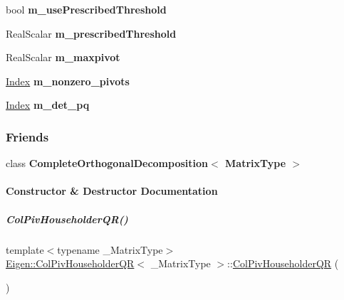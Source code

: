 \begin{DoxyCompactItemize}
\mbox{\label{group___q_r___module_ad155de2c03a65d9be81a9174efe6e43a}} 
bool {\bfseries m\+\_\+use\+Prescribed\+Threshold}
\item 
\mbox{\label{group___q_r___module_a9a4f85e7fb5dbb8d46781550f567e1fc}} 
Real\+Scalar {\bfseries m\+\_\+prescribed\+Threshold}
\item 
\mbox{\label{group___q_r___module_a65f1f2cae0c047868da485c8db81f1a3}} 
Real\+Scalar {\bfseries m\+\_\+maxpivot}
\item 
\mbox{\label{group___q_r___module_ab99a6c9cc74ca1441d955605cccad919}} 
\hyperlink{namespace_eigen_a62e77e0933482dafde8fe197d9a2cfde}{Index} {\bfseries m\+\_\+nonzero\+\_\+pivots}
\item 
\mbox{\label{group___q_r___module_a43597f3b3ae67cc05edac305ef24dad7}} 
\hyperlink{namespace_eigen_a62e77e0933482dafde8fe197d9a2cfde}{Index} {\bfseries m\+\_\+det\+\_\+pq}
\end{DoxyCompactItemize}
\subsubsection*{Friends}
\begin{DoxyCompactItemize}
\item 
\mbox{\label{group___q_r___module_a6c741054e65697365ce75f1bbec5802b}} 
class {\bfseries Complete\+Orthogonal\+Decomposition$<$ Matrix\+Type $>$}
\end{DoxyCompactItemize}


\paragraph{Constructor \& Destructor Documentation}
\mbox{\label{group___q_r___module_a9d8a92c2a2f0debe5454812372237ed4}} 
\subparagraph{\texorpdfstring{Col\+Piv\+Householder\+Q\+R()}{ColPivHouseholderQR()}\hspace{0.1cm}{\footnotesize\ttfamily [1/8]}}
{\footnotesize\ttfamily template$<$typename \+\_\+\+Matrix\+Type$>$ \\
\hyperlink{group___q_r___module_class_eigen_1_1_col_piv_householder_q_r}{Eigen\+::\+Col\+Piv\+Householder\+QR}$<$ \+\_\+\+Matrix\+Type $>$\+::\hyperlink{group___q_r___module_class_eigen_1_1_col_piv_householder_q_r}{Col\+Piv\+Householder\+QR} (\begin{DoxyParamCaption}{ }\end{DoxyParamCaption})\hspace{0.3cm}{\ttfamily [inline]}}



